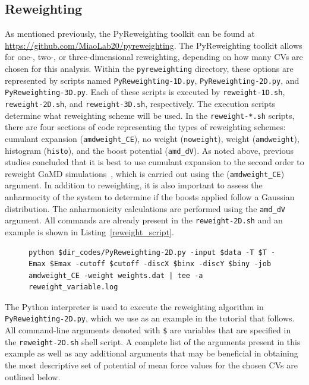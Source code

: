\documentclass[9pt,tutorial,pubversion]{livecoms}
\begin{document}
\subsection{Reweighting}
\label{ss:reweight}
As mentioned previously, the PyReweighting toolkit can be found at \url{https://github.com/MiaoLab20/pyreweighting}. The PyReweighting toolkit allows for one-, two-, or three-dimensional reweighting, depending on how many CVs are chosen for this analysis. Within the \texttt{pyreweighting} directory, these options are represented by scripts named \texttt{PyReweighting-1D.py}, \texttt{PyReweighting-2D.py}, and \texttt{PyReweighting-3D.py}. Each of these scripts is executed by \texttt{reweight-1D.sh}, \texttt{reweight-2D.sh}, and \texttt{reweight-3D.sh}, respectively. The execution scripts determine what reweighting scheme will be used. In the \texttt{reweight-*.sh} scripts, there are four sections of code representing the types of reweighting schemes: cumulant expansion (\texttt{amdweight\_CE}), no weight (\texttt{noweight}), weight (\texttt{amdweight}), histogram (\texttt{histo}), and the boost potential (\texttt{amd\_dV}). As noted above, previous studies concluded that it is best to use cumulant expansion to the second order to reweight GaMD simulations~\cite{shen_statistical_2008, miao_improved_2014}, which is carried out using the (\texttt{amdweight\_CE}) argument. In addition to reweighting, it is also important to assess the anharmocity of the system to determine if the boosts applied follow a Gaussian distribution. The anharmonicity calculations are performed using the \texttt{amd\_dV} argument. All commands are already present in the \texttt{reweight-2D.sh} and an example is shown in Listing~\ref{reweight_script}.

\begin{figure}[hbt]
\begin{lstlisting}[label=reweight_script,caption=reweight-2D.sh, basicstyle=\small,breaklines=true, backgroundcolor=\color{light-gray}]
python $dir_codes/PyReweighting-2D.py -input $data -T $T -Emax $Emax -cutoff $cutoff -discX $binx -discY $biny -job amdweight_CE -weight weights.dat | tee -a reweight_variable.log
\end{lstlisting}
\end{figure}

The Python interpreter is used to execute the reweighting algorithm in \texttt{PyReweighting-2D.py}, which we use as an example in the tutorial that follows. All command-line arguments denoted with \texttt{\$} are variables that are specified in the \texttt{reweight-2D.sh} shell script. A complete list of the arguments present in this example as well as any additional arguments that may be beneficial in obtaining the most descriptive set of potential of mean force values for the chosen CVs are outlined below.
\end{document}
